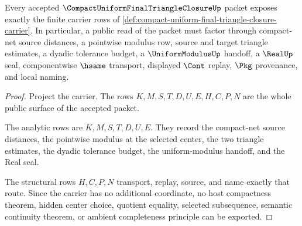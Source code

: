 \begin{theorem}
\label{thm:compact-uniform-final-triangle-closure-carrier}
Every accepted $\CompactUniformFinalTriangleClosureUp$ packet exposes exactly the finite carrier rows of \autoref{def:compact-uniform-final-triangle-closure-carrier}. In particular, a public read of the packet must factor through compact-net source distances, a pointwise modulus row, source and target triangle estimates, a dyadic tolerance budget, a $\UniformModulusUp$ handoff, a $\RealUp$ seal, componentwise $\hsame$ transport, displayed $\Cont$ replay, $\Pkg$ provenance, and local naming.
\end{theorem}
\begin{proof}
Project the carrier. The rows $K,M,S,T,D,U,E,H,C,P,N$ are the whole public surface of the accepted packet.

The analytic rows are $K,M,S,T,D,U,E$. They record the compact-net source distances, the pointwise modulus at the selected center, the two triangle estimates, the dyadic tolerance budget, the uniform-modulus handoff, and the Real seal.

The structural rows $H,C,P,N$ transport, replay, source, and name exactly that route. Since the carrier has no additional coordinate, no host compactness theorem, hidden center choice, quotient equality, selected subsequence, semantic continuity theorem, or ambient completeness principle can be exported.
\end{proof}

